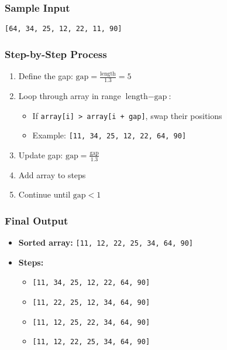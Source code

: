 \documentclass{article}
\begin{document}
\subsubsection*{Sample Input}
\texttt{[64, 34, 25, 12, 22, 11, 90]}

\subsubsection*{Step-by-Step Process}
\begin{enumerate}
    \item Define the gap: \(\text{gap} = \frac{\text{length}}{1.3} = 5\)
    
    \item Loop through array in range \(\text{length} - \text{gap}\):
    \begin{itemize}
        \item If \texttt{array[i] > array[i + gap]}, swap their positions
        \item Example: \texttt{[11, 34, 25, 12, 22, 64, 90]}
    \end{itemize}

    \item Update gap: \(\text{gap} = \frac{\text{gap}}{1.3}\)

    \item Add array to steps

    \item Continue until \(\text{gap} < 1\)
\end{enumerate}
\subsubsection*{Final Output}
\begin{itemize}
    \item \textbf{Sorted array:} \texttt{[11, 12, 22, 25, 34, 64, 90]}
    
    \item \textbf{Steps:} 
    \begin{itemize}
        \item \texttt{[11, 34, 25, 12, 22, 64, 90]}
        \item \texttt{[11, 22, 25, 12, 34, 64, 90]}
        \item \texttt{[11, 12, 25, 22, 34, 64, 90]}
        \item \texttt{[11, 12, 22, 25, 34, 64, 90]}
    \end{itemize}
\end{itemize}
\end{document}
